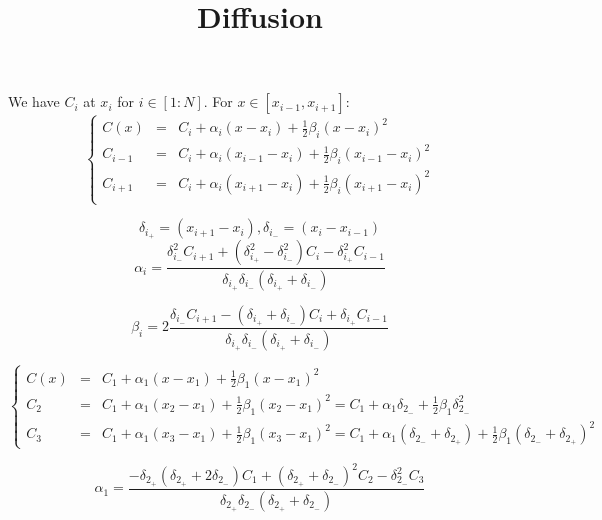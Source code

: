 \documentclass[aps,11pt]{revtex4}
\begin{document}
\title{Diffusion}
\maketitle

We have $C_{i}$ at $x_i$ for $i\in[1:N]$.
For $x\in[x_{i-1},x_{i+1}]$:
\begin{equation}
\left\lbrace
\begin{array}{rcl}
	C(x)    & = & C_i + \alpha_i (x-x_i) + \frac{1}{2}\beta_i (x-x_i)^2\\
	C_{i-1} & = & C_i + \alpha_i (x_{i-1}-x_{i} ) + \frac{1}{2}\beta_i (x_{i-1}-x_i)^2\\
    C_{i+1} & = & C_i + \alpha_i (x_{i+1}-x_{i} ) + \frac{1}{2}\beta_i (x_{i+1}-x_i)^2\\
\end{array}
\right.
\end{equation}

$$
	\delta_{i_+} = (x_{i+1}-x_{i} ), \delta_{i_-} = (x_{i}-x_{i-1} ) 
$$
\begin{equation}
	\alpha_i = \dfrac{ \delta_{i_-}^2 C_{i+1}  +(\delta_{i_+}^2-\delta_{i_-}^2)C_i - \delta_{i_+}^2 C_{i-1} }{ \delta_{i_+}\delta_{i_-}(\delta_{i_+}+\delta_{i_-})  }
\end{equation}

\begin{equation}
	\beta_i = 2\dfrac{ \delta_{i_-} C_{i+1}  - (\delta_{i_+}+\delta_{i_-})C_i + \delta_{i_+} C_{i-1} }{ \delta_{i_+}\delta_{i_-}(\delta_{i_+}+\delta_{i_-})  }
\end{equation}

\begin{equation}
\left\lbrace
\begin{array}{rcl}
	C(x)   & = & C_1 + \alpha_1 (x-x_1) + \frac{1}{2}\beta_1 (x-x_1)^2\\
	C_2    & = & C_1 + \alpha_1 (x_2-x_1) + \frac{1}{2}\beta_1 (x_2-x_1)^2 = C_1 + \alpha_1 \delta_{2_-} + \frac{1}{2}\beta_1 \delta_{2_-}^2 \\
	C_3    & = & C_1 + \alpha_1 (x_3-x_1) + \frac{1}{2}\beta_1 (x_3-x_1)^2 = C_1 + \alpha_1 (\delta_{2_-}+ \delta_{2_+} )+ \frac{1}{2}\beta_1 (\delta_{2_-}+ \delta_{2_+} )^2
\end{array}
\right.
\end{equation}

\begin{equation}
	\alpha_1 = \dfrac{ -\delta_{2_+}(\delta_{2_+}+2\delta_{2_-}) C_1 + (\delta_{2_+}+\delta_{2_-})^2  C_2 - \delta_{2_-}^2 C_3}{\delta_{2_+}\delta_{2_-}(\delta_{2_+}+\delta_{2_-})}
\end{equation}
\end{document}
